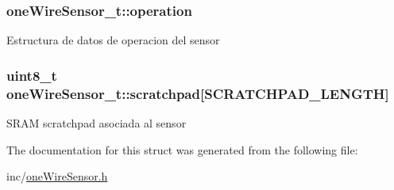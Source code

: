 \subsubsection[{\texorpdfstring{operation}{operation}}]{ one\+Wire\+Sensor\+\_\+t\+::operation}\hypertarget{structoneWireSensor__t_ada7c05de5b39edd0d2488c91dad12530}{}\label{structoneWireSensor__t_ada7c05de5b39edd0d2488c91dad12530}
Estructura de datos de operacion del sensor 
\subsubsection[{\texorpdfstring{scratchpad}{scratchpad}}]{\setlength{\rightskip}{0pt plus 5cm}uint8\+\_\+t one\+Wire\+Sensor\+\_\+t\+::scratchpad\mbox{[}{\bf S\+C\+R\+A\+T\+C\+H\+P\+A\+D\+\_\+\+L\+E\+N\+G\+TH}\mbox{]}}\hypertarget{structoneWireSensor__t_a2e6e1b03a1f5e86a53978c07e1371c01}{}\label{structoneWireSensor__t_a2e6e1b03a1f5e86a53978c07e1371c01}
S\+R\+AM scratchpad asociada al sensor 

The documentation for this struct was generated from the following file\+:\begin{DoxyCompactItemize}
\item 
inc/\hyperlink{oneWireSensor_8h}{one\+Wire\+Sensor.\+h}\end{DoxyCompactItemize}
